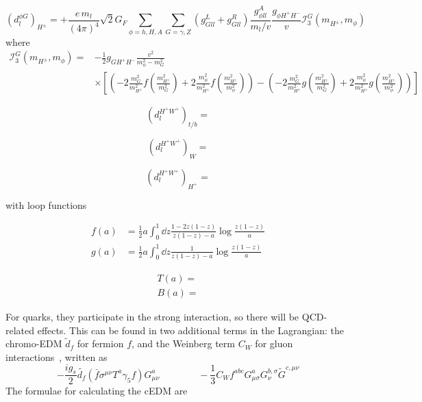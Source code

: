 \begin{equation}\label{eq:BarrZee-phiG-cHloop}
	(d^{\phi G}_{l})_{H^{\pm}} = +\frac{e\,m_{l}}{(4\pi)^{4}}\sqrt{2}G_{F}\sum_{\phi=h,H,A}\sum_{G=\gamma,Z}(g_{Gll}^{L}+g_{Gll}^{R})\frac{g_{\phi ll}^{A}}{m_{l}/v}\frac{g_{\phi H^{+}H^{-}}}{v}\mathcal{I}_{3}^{G}(m_{H^{\pm}}, m_{\phi})
\end{equation}
where
\begin{align}
	\mathcal{I}_{3}^{G}(m_{H^{\pm}}, m_{\phi}) =& -\frac{1}{2}g_{GH^{+}H^{-}}\frac{v^{2}}{m_{\phi}^{2}-m_{G}^{2}} \nonumber \\
	& \times \left[\left(-2\frac{m_{G}^{2}}{m_{H^{\pm}}^{2}} f\left(\frac{m_{H^{\pm}}^{2}}{m_{G}^{2}}\right) + 2\frac{m_{\phi}^{2}}{m_{H^{\pm}}^{2}} f\left(\frac{m_{H^{\pm}}^{2}}{m_{\phi}^{2}}\right)\right)
	-\left(-2\frac{m_{G}^{2}}{m_{H^{\pm}}^{2}} g\left(\frac{m_{H^{\pm}}^{2}}{m_{G}^{2}}\right) + 2\frac{m_{\phi}^{2}}{m_{H^{\pm}}^{2}} g\left(\frac{m_{H^{\pm}}^{2}}{m_{\phi}^{2}}\right)\right)\right]
\end{align}

\begin{equation}\label{eq:BarrZee-cHW-tbloop}
	(d^{H^{+}W^{+}}_{l})_{t/b} = 
\end{equation}

\begin{equation}\label{eq:BarrZee-cHW-Wloop}
	(d^{H^{+}W^{+}}_{l})_{W} = 
\end{equation}

\begin{equation}\label{eq:BarrZee-cHW-cHloop}
	(d^{H^{+}W^{+}}_{l})_{H^{+}} = 
\end{equation}

with loop functions

\begin{align}
	f(a) &= \frac{1}{2} a \int_{0}^{1}\dd{z}\frac{1-2z(1-z)}{z(1-z)-a}\log{\frac{z(1-z)}{a}} \nonumber \\
	g(a) &= \frac{1}{2} a \int_{0}^{1}\dd{z}\frac{1}{z(1-z)-a}\log{\frac{z(1-z)}{a}}
\end{align}

\begin{align}
	T(a)= \nonumber \\
	B(a)=
\end{align}

For quarks, they participate in the strong interaction, so there will be QCD-related effects.
This can be found in two additional terms in the Lagrangian: 
the chromo-EDM \(\tilde{d}_{f} \) for fermion \(f \), and the Weinberg term \(C_{W} \) for gluon interactions~\cite{Weinberg89}, written as
\begin{equation}
  -\frac{i g_{s}}{2}\tilde{d_{f}}\left(\bar{f}\sigma^{\mu\nu}T^{a}\gamma_{5}f\right)G^{a}_{\mu\nu}\quad \qquad \quad -\frac{1}{3}C_Wf^{abc}G^{a}_{\mu\sigma}G^{b,\sigma}_{\nu}\tilde{G}^{c,\mu\nu}
\end{equation}
The formulae for calculating the cEDM are

